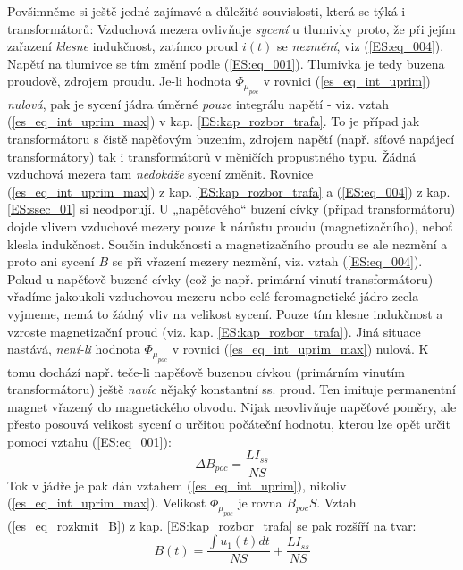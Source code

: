 {      Povšimněme si ještě jedné zajímavé a důležité souvislosti, která se týká i transformátorů:
      Vzduchová mezera ovlivňuje \emph{sycení} u tlumivky proto, že při jejím zařazení 
      \emph{klesne} indukčnost, zatímco proud \(i(t)\) se \emph{nezmění}, viz (\ref{ES:eq_004}). 
      Napětí na tlumivce se tím změní podle (\ref{ES:eq_001}). Tlumivka je tedy buzena
      proudově, zdrojem proudu. Je-li hodnota \(\Phi_{\mu_{poc}}\) v rovnici 
      (\ref{es_eq_int_uprim}) \emph{nulová}, pak je sycení jádra úměrné \emph{pouze} integrálu 
      napětí - viz. vztah (\ref{es_eq_int_uprim_max}) v kap. \ref{ES:kap_rozbor_trafa}. To je 
      případ jak transformátoru s čistě napěťovým buzením, zdrojem napětí (např. síťové napájecí 
      transformátory) tak i transformátorů v měničích propustného typu. Žádná vzduchová mezera tam 
      \emph{nedokáže} sycení změnit. Rovnice (\ref{es_eq_int_uprim_max}) z kap. 
      \ref{ES:kap_rozbor_trafa} a (\ref{ES:eq_004}) z kap. \ref{ES:ssec_01} si neodporují. U 
      „napěťového“ buzení cívky (případ transformátoru) dojde vlivem vzduchové mezery pouze k 
      nárůstu proudu (magnetizačního), neboť klesla indukčnost. Součin indukčnosti a magnetizačního 
      proudu se ale nezmění a proto ani sycení \(B\) se při vřazení mezery nezmění, viz. vztah 
      (\ref{ES:eq_004}). Pokud u napěťově buzené cívky (což je např. primární vinutí
      transformátoru) vřadíme jakoukoli vzduchovou mezeru nebo celé feromagnetické jádro zcela
      vyjmeme, nemá to žádný vliv na velikost sycení. Pouze tím klesne indukčnost a vzroste 
      magnetizační proud (viz. kap. \ref{ES:kap_rozbor_trafa}). Jiná situace nastává, 
      \emph{není-li} hodnota \(\Phi_{\mu_{poc}}\) v rovnici (\ref{es_eq_int_uprim_max}) nulová. K 
      tomu dochází např. teče-li napěťově buzenou cívkou (primárním vinutím transformátoru) ještě 
      \emph{navíc} nějaký konstantní ss. proud. Ten imituje permanentní magnet vřazený do 
      magnetického obvodu. Nijak neovlivňuje napěťové poměry, ale přesto posouvá velikost sycení o 
      určitou počáteční hodnotu, kterou lze opět určit pomocí vztahu (\ref{ES:eq_001}):
      \begin{equation}\label{ES:eq_013}
         \Delta B_{poc} = \frac{LI_{ss}}{NS}
      \end{equation}
      Tok v jádře je pak dán vztahem (\ref{es_eq_int_uprim}), nikoliv (\ref{es_eq_int_uprim_max}). 
      Velikost \(\Phi_{\mu_{poc}}\) je rovna \(B_{poc}S\). Vztah (\ref{es_eq_rozkmit_B}) z kap. 
      \ref{ES:kap_rozbor_trafa} se pak rozšíří na tvar:
      \begin{equation}\label{ES_eq_014}
        B(t)=\frac{\int u_1(t)dt}{NS} + \frac{LI_{ss}}{NS}
      \end{equation}
      
}
